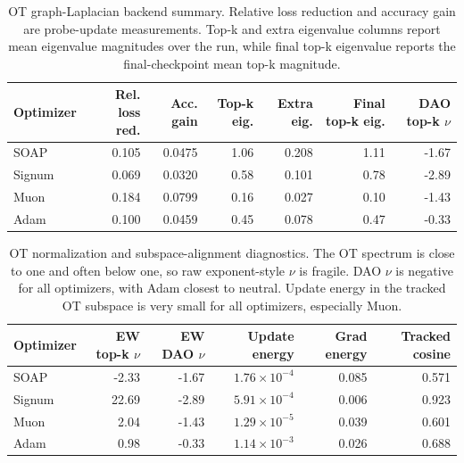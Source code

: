 \documentclass[11pt]{article}
\begin{document}
\begin{table}[htbp]
\centering
\small
\begin{tabular}{lrrrrrr}
\toprule
Optimizer & Rel. loss red. & Acc. gain & Top-k eig. & Extra eig. & Final top-k eig. & DAO top-k $\nu$ \\
\midrule
SOAP & 0.105 & 0.0475 & 1.06 & 0.208 & 1.11 & -1.67 \\
Signum & 0.069 & 0.0320 & 0.58 & 0.101 & 0.78 & -2.89 \\
Muon & 0.184 & 0.0799 & 0.16 & 0.027 & 0.10 & -1.43 \\
Adam & 0.100 & 0.0459 & 0.45 & 0.078 & 0.47 & -0.33 \\
\bottomrule
\end{tabular}
\caption{OT graph-Laplacian backend summary. Relative loss reduction and accuracy gain are probe-update measurements. Top-k and extra eigenvalue columns report mean eigenvalue magnitudes over the run, while final top-k eigenvalue reports the final-checkpoint mean top-k magnitude.}
\label{tab:ot-summary}
\end{table}

\begin{table}[htbp]
\centering
\small
\begin{tabular}{lrrrrr}
\toprule
Optimizer & EW top-k $\nu$ & EW DAO $\nu$ & Update energy & Grad energy & Tracked cosine \\
\midrule
SOAP & -2.33 & -1.67 & $1.76{\times}10^{-4}$ & 0.085 & 0.571 \\
Signum & 22.69 & -2.89 & $5.91{\times}10^{-4}$ & 0.006 & 0.923 \\
Muon & 2.04 & -1.43 & $1.29{\times}10^{-5}$ & 0.039 & 0.601 \\
Adam & 0.98 & -0.33 & $1.14{\times}10^{-3}$ & 0.026 & 0.688 \\
\bottomrule
\end{tabular}
\caption{OT normalization and subspace-alignment diagnostics. The OT spectrum is close to one and often below one, so raw exponent-style $\nu$ is fragile. DAO $\nu$ is negative for all optimizers, with Adam closest to neutral. Update energy in the tracked OT subspace is very small for all optimizers, especially Muon.}
\label{tab:ot-normalization}
\end{table}
\end{document}
